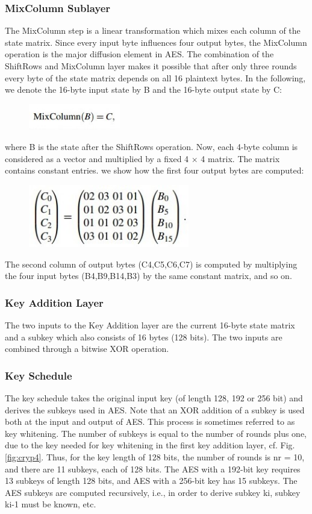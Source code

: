 \documentclass[../main.tex]{subfiles}
\begin{document}
\subsubsection{MixColumn Sublayer}
The MixColumn step is a linear transformation which mixes each column of the
state matrix. Since every input byte influences four output bytes, the MixColumn
operation is the major diffusion element in AES. The combination of the ShiftRows
and MixColumn layer makes it possible that after only three rounds every byte of
the state matrix depends on all 16 plaintext bytes.
In the following, we denote the 16-byte input state by B and the 16-byte output
state by C:
\begin{figure}[h]
\centering
\includegraphics[width=4cm]{diagrams/cryp12.jpg}
\end{figure}

where B is the state after the ShiftRows operation.
Now, each 4-byte column is considered as a vector and multiplied by a fixed
4 × 4 matrix. The matrix contains constant entries.
we show how the first four output
bytes are computed:
\begin{figure}[h]
\centering
\includegraphics[width=7cm]{diagrams/cryp13.jpg}
\end{figure}
The second column of output bytes (C4,C5,C6,C7) is computed by multiplying
the four input bytes (B4,B9,B14,B3) by the same constant matrix, and so on. 

\subsubsection{Key Addition Layer}
The two inputs to the Key Addition layer are the current 16-byte state matrix and
a subkey which also consists of 16 bytes (128 bits). The two inputs are combined
through a bitwise XOR operation. 

\subsubsection{Key Schedule}
The key schedule takes the original input key (of length 128, 192 or 256 bit) and
derives the subkeys used in AES. Note that an XOR addition of a subkey is used
both at the input and output of AES. This process is sometimes referred to as key
whitening. The number of subkeys is equal to the number of rounds plus one, due
to the key needed for key whitening in the first key addition layer, cf. Fig. \ref{fig:cryp4}.
Thus, for the key length of 128 bits, the number of rounds is nr = 10, and there are
11 subkeys, each of 128 bits. The AES with a 192-bit key requires 13 subkeys of
length 128 bits, and AES with a 256-bit key has 15 subkeys. The AES subkeys are
computed recursively, i.e., in order to derive subkey ki, subkey ki-1 must be known,
etc.\cite{10.5555/1721909}
\end{document}
